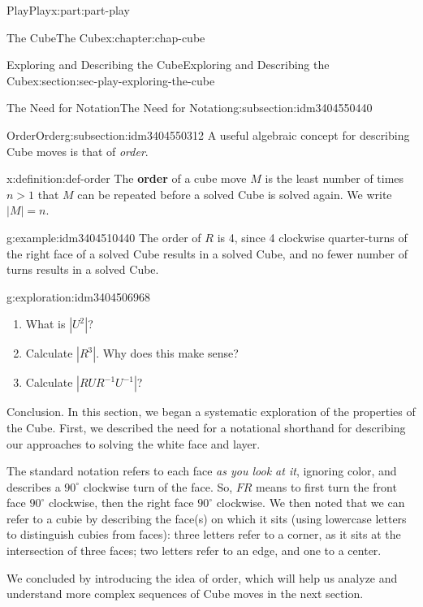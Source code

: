 \documentclass[oneside,10pt,]{book}
\newcommand{\terminology}[1]{\textbf{#1}}
\numberwithin{equation}{section}
\newcommand{\gt}{>}
\begin{document}
\begin{partptx}{Play}{}{Play}{}{}{x:part:part-play}
\begin{chapterptx}{The Cube}{}{The Cube}{}{}{x:chapter:chap-cube}
\begin{sectionptx}{Exploring and Describing the Cube}{}{Exploring and Describing the Cube}{}{}{x:section:sec-play-exploring-the-cube}
\begin{subsectionptx}{The Need for Notation}{}{The Need for Notation}{}{}{g:subsection:idm3404550440}
\end{subsectionptx}
%
%
\typeout{************************************************}
\typeout{************************************************}
%
\begin{subsectionptx}{Order}{}{Order}{}{}{g:subsection:idm3404550312}
A useful algebraic concept for describing Cube moves is that of \emph{order}.%
\begin{definition}{}{x:definition:def-order}%
%
The \terminology{order} of a cube move \(M\) is the least number of times \(n \gt 1\) that \(M\) can be repeated before a solved Cube is solved again. We write \(|M| = n\).%
\end{definition}
\begin{example}{}{g:example:idm3404510440}%
The order of \(R\) is 4, since 4 clockwise quarter-turns of the right face of a solved Cube results in a solved Cube, and no fewer number of turns results in a solved Cube.%
\end{example}
\begin{exploration}{}{g:exploration:idm3404506968}%
%
\begin{enumerate}
\item{}What is \(|U^2|\)?%
\item{}Calculate \(|R^3|\). Why does this make sense?%
\item{}Calculate \(|RUR^{-1} U^{-1}|\)?%
\end{enumerate}
\end{exploration}%
\end{subsectionptx}
\begin{conclusion}{Conclusion.}%
In this section, we began a systematic exploration of the properties of the Cube. First, we described the need for a notational shorthand for describing our approaches to solving the white face and layer.%
\par
The standard notation refers to each face \emph{as you look at it}, ignoring color, and describes a \(90^\circ\) clockwise turn of the face. So, \(FR\) means to first turn the front face \(90^\circ\) clockwise, then the right face \(90^\circ\) clockwise. We then noted that we can refer to a cubie by describing the face(s) on which it sits (using lowercase letters to distinguish cubies from faces): three letters refer to a corner, as it sits at the intersection of three faces; two letters refer to an edge, and one to a center.%
\par
We concluded by introducing the idea of order, which will help us analyze and understand more complex sequences of Cube moves in the next section.%

\end{conclusion}
\end{sectionptx}
\end{chapterptx}
\end{partptx}
\end{document}

